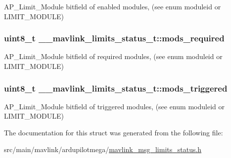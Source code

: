 A\+P\+\_\+\+Limit\+\_\+\+Module bitfield of enabled modules, (see enum moduleid or L\+I\+M\+I\+T\+\_\+\+M\+O\+D\+U\+L\+E) 

\hypertarget{struct____mavlink__limits__status__t_a5c6d271b40d4106271f506fef6ec66ea}{
\subsubsection[{mods\+\_\+required}]{\setlength{\rightskip}{0pt plus 5cm}uint8\+\_\+t \+\_\+\+\_\+mavlink\+\_\+limits\+\_\+status\+\_\+t\+::mods\+\_\+required}}\label{struct____mavlink__limits__status__t_a5c6d271b40d4106271f506fef6ec66ea}


A\+P\+\_\+\+Limit\+\_\+\+Module bitfield of required modules, (see enum moduleid or L\+I\+M\+I\+T\+\_\+\+M\+O\+D\+U\+L\+E) 

\hypertarget{struct____mavlink__limits__status__t_a8023524497cd6ae231dd32a3b80d0b9b}{
\subsubsection[{mods\+\_\+triggered}]{\setlength{\rightskip}{0pt plus 5cm}uint8\+\_\+t \+\_\+\+\_\+mavlink\+\_\+limits\+\_\+status\+\_\+t\+::mods\+\_\+triggered}}\label{struct____mavlink__limits__status__t_a8023524497cd6ae231dd32a3b80d0b9b}


A\+P\+\_\+\+Limit\+\_\+\+Module bitfield of triggered modules, (see enum moduleid or L\+I\+M\+I\+T\+\_\+\+M\+O\+D\+U\+L\+E) 



The documentation for this struct was generated from the following file\+:\begin{DoxyCompactItemize}
\item 
src/main/mavlink/ardupilotmega/\hyperlink{mavlink__msg__limits__status_8h}{mavlink\+\_\+msg\+\_\+limits\+\_\+status.\+h}\end{DoxyCompactItemize}
